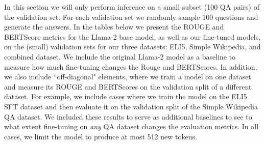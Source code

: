 \documentclass[11pt, oneside]{article}   	%
\begin{document}
In this section we will only perform inference on a small subset (100 QA pairs) of the validation set. 
For each validation set we randomly sample 100 questions and generate the answers.
In the tables below we present the ROUGE and BERTScore metrics for the Llama-2 base model, as well as our fine-tuned models, on the (small) validation sets for our three datasets: ELI5, Simple Wikipedia, and combined dataset.
We include the original Llama-2 model as a baseline to measure how much fine-tuning changes the Rouge and BERTScores.
In addition, we also include ``off-diagonal" elements, where we train a model on one dataset and measure its ROUGE and BERTScores on the validation split of a different dataset.
For example, we include cases where we train the model on the ELI5 SFT dataset and then evaluate it on the validation split of the Simple Wikipedia QA dataset.
We included these results to serve as additional baselines to see to what extent fine-tuning on \textit{any} QA dataset changes the evaluation metrics.
In all cases, we limit the model to produce at most 512 new tokens.
\end{document}
